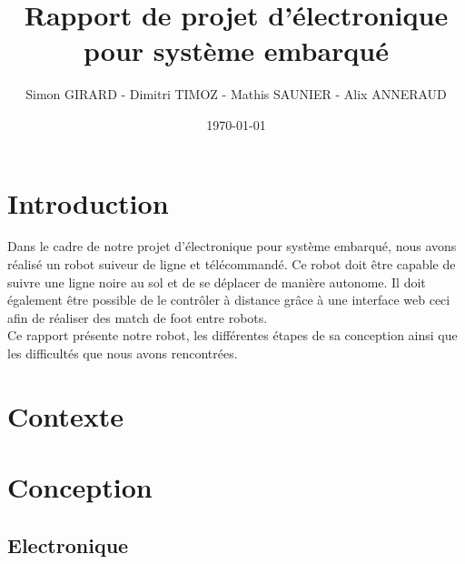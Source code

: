 \documentclass[a4paper, 12pt]{report}
\title{Rapport de projet d'électronique pour système embarqué}
\author{Simon GIRARD - Dimitri TIMOZ - Mathis SAUNIER - Alix ANNERAUD}
\date{\today}
\begin{document}


\tableofcontents

\chapter{Introduction}
 Dans le cadre de notre projet d'électronique pour système embarqué, nous avons réalisé un robot suiveur de ligne et télécommandé. Ce robot doit être capable de suivre une ligne noire au sol et de se déplacer de manière autonome. Il doit également être possible de le contrôler à distance grâce à une interface web ceci afin de réaliser des match de foot entre robots.
\\
Ce rapport présente notre robot, les différentes étapes de sa conception ainsi que les difficultés que nous avons rencontrées.
\chapter{Contexte}
\lipsum[3-4]

\chapter{Conception}

\section{Electronique}
\end{document}
